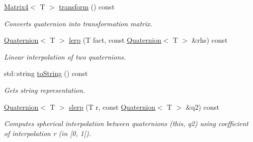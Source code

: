 \begin{DoxyCompactItemize}
\hyperlink{class_matrix4}{Matrix4}$<$ T $>$ \hyperlink{class_quaternion_a00298e05ea5d74c7a25d072b88e20399}{transform} () const 
\begin{DoxyCompactList}\small\item\em Converts quaternion into transformation matrix. \item\end{DoxyCompactList}\item 
\hyperlink{class_quaternion}{Quaternion}$<$ T $>$ \hyperlink{class_quaternion_a8e8e63deaa3c53c63f9dad8556ec1612}{lerp} (T fact, const \hyperlink{class_quaternion}{Quaternion}$<$ T $>$ \&rhs) const 
\begin{DoxyCompactList}\small\item\em Linear interpolation of two quaternions. \item\end{DoxyCompactList}\item 
std::string \hyperlink{class_quaternion_a48b3e7bf721bb2d451dd5845e29f96f2}{toString} () const 
\begin{DoxyCompactList}\small\item\em Gets string representation. \item\end{DoxyCompactList}\item 
\hyperlink{class_quaternion}{Quaternion}$<$ T $>$ \hyperlink{class_quaternion_a6772ea8a4dee0d24913e26c88dc1d3c8}{slerp} (T r, const \hyperlink{class_quaternion}{Quaternion}$<$ T $>$ \&q2) const 
\begin{DoxyCompactList}\small\item\em Computes spherical interpolation between quaternions (this, q2) using coefficient of interpolation r (in \mbox{[}0, 1\mbox{]}). \item\end{DoxyCompactList}\end{DoxyCompactItemize}
